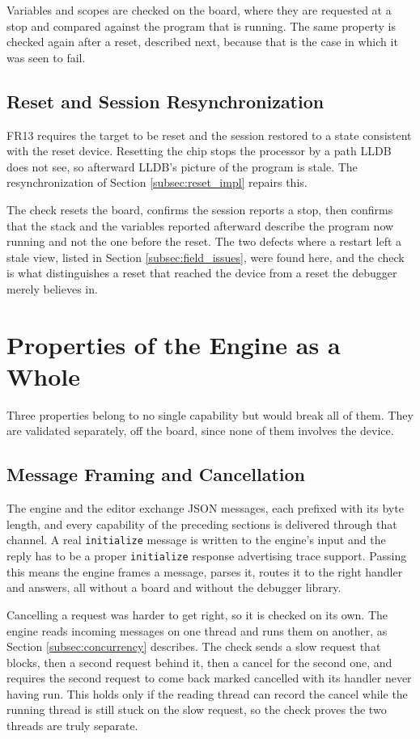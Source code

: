 Variables and scopes are checked on the board, where they are requested at a stop and compared against the program that is running. The same property is checked again after a reset, described next, because that is the case in which it was seen to fail.

\subsection{Reset and Session Resynchronization}
\label{subsec:val_reset}
FR13 requires the target to be reset and the session restored to a state consistent with the reset device. Resetting the chip stops the processor by a path LLDB does not see, so afterward LLDB's picture of the program is stale. The resynchronization of Section \ref{subsec:reset_impl} repairs this.

The check resets the board, confirms the session reports a stop, then confirms that the stack and the variables reported afterward describe the program now running and not the one before the reset. The two defects where a restart left a stale view, listed in Section \ref{subsec:field_issues}, were found here, and the check is what distinguishes a reset that reached the device from a reset the debugger merely believes in.


\section{Properties of the Engine as a Whole}
\label{sec:val_engine}
Three properties belong to no single capability but would break all of them. They are validated separately, off the board, since none of them involves the device.

\subsection{Message Framing and Cancellation}
\label{subsec:val_protocol}
The engine and the editor exchange JSON messages, each prefixed with its byte length, and every capability of the preceding sections is delivered through that channel. A real \texttt{initialize} message is written to the engine's input and the reply has to be a proper \texttt{initialize} response advertising trace support. Passing this means the engine frames a message, parses it, routes it to the right handler and answers, all without a board and without the debugger library.

Cancelling a request was harder to get right, so it is checked on its own. The engine reads incoming messages on one thread and runs them on another, as Section \ref{subsec:concurrency} describes. The check sends a slow request that blocks, then a second request behind it, then a cancel for the second one, and requires the second request to come back marked cancelled with its handler never having run. This holds only if the reading thread can record the cancel while the running thread is still stuck on the slow request, so the check proves the two threads are truly separate.

